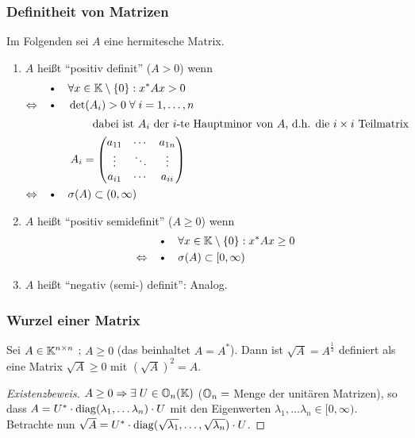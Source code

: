 \subsubsection{Definitheit von Matrizen}
Im Folgenden sei $A$ eine hermitesche Matrix.
\begin{enumerate}
  \item [a)] $A$ heißt "`positiv definit"' ($A > 0$) wenn
  \begin{align*}
    &\text{\textbullet} \quad \forall x \in \KK \setminus \{0\}: x^* A x > 0 \\
    \Leftrightarrow \quad &\text{\textbullet} \quad \det(A_i) > 0 \; \forall \; i = 1, \dots , n \\
    \intertext{\qquad \qquad \qquad dabei ist $A_i$ der $i$-te Hauptminor von $A$, d.h. die $i\times i$ Teilmatrix}
    & \quad \quad A_i =
    \begin{pmatrix}
      a_{11} & \cdots  & a_{1n} \\
      \vdots & \ddots & \vdots \\
      a_{i1} & \cdots & a_{ii}
    \end{pmatrix} \\
    \Leftrightarrow \quad &\text{\textbullet} \quad  \sigma (A) \subset (0, \infty)
  \end{align*}
  \item[b)]$A$ heißt "`positiv semidefinit"' ($A \ge 0$) wenn
    \begin{align*}
    &\text{\textbullet} \quad \forall x \in \KK \setminus \{0\}: x^* A x \ge 0 \\
    \Leftrightarrow \quad &\text{\textbullet} \quad  \sigma (A) \subset [0, \infty)
  \end{align*}
  \item[c)] $A$ heißt "`negativ (semi-) definit"': Analog.
\end{enumerate}

\subsubsection{Wurzel einer Matrix}
Sei $A \in \mathbb K^{n \times n}$ ; $A \ge 0$ (das beinhaltet $A = A^*$). Dann ist
$\sqrt{A} = A^{\frac{1}{2}}$ definiert als eine Matrix $\sqrt{A} \ge 0$ mit
$\left(\sqrt{A} \right)^2 = A$.

\begin{proof}[Existenzbeweis]
$A \ge 0 \Rightarrow \exists \; U \in \mathbb O_n(\mathbb K)$ ($\mathbb O_n = $ Menge
der unitären Matrizen), so dass  \newline
$A = U^* \cdot \operatorname*{\mathrm{diag}}(\lambda_1, \dots \lambda_n) \cdot U$ mit den Eigenwerten
$\lambda_1, \dots \lambda_n \in [0, \infty)$. \newline
Betrachte nun $\sqrt{A} = U^* \cdot \operatorname*{\mathrm{diag}}(\sqrt{\lambda_1}, \dots, \sqrt{\lambda_n}) \cdot U$.
\end{proof}

